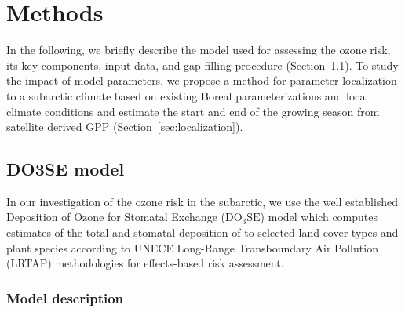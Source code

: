 \documentclass[bg, manuscript]{copernicus}
\begin{document}
\section{Methods}
\label{sec:dam}
In the following, we briefly describe the model used for assessing the ozone risk, its key components, input data, and gap filling procedure (Section~\ref{sec:do3se}). To study the impact of model parameters, we propose a method for parameter localization to a subarctic climate based on existing Boreal parameterizations and local climate conditions and estimate the start and end of the growing season from satellite derived GPP (Section~\ref{sec:localization}).

\subsection{DO3SE model}
\label{sec:do3se}
In our investigation of the ozone risk in the subarctic, we use the well established Deposition of Ozone for Stomatal Exchange ($\mathrm{DO_3SE}$) model \citep{ACP:Bueker2012} which computes estimates of the total and stomatal deposition of  to selected land-cover types and plant species according to UNECE Long-Range Transboundary Air Pollution (LRTAP) methodologies for effects-based risk assessment.

\subsubsection{Model description}
\label{subsec:model_describtion}
\end{document}
